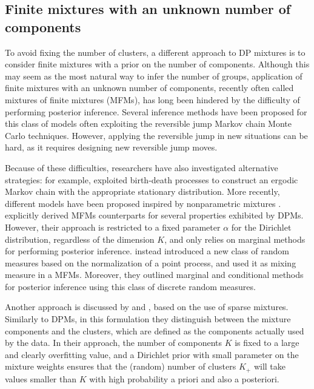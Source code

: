 \subsection{Finite mixtures with an unknown number of components}
To avoid fixing the number of clusters, a different approach to DP mixtures is to consider finite mixtures with a prior on the number of components. Although this may seem as the most natural way to infer the number of groups, application of finite mixtures with an unknown number of components, recently often called mixtures of finite mixtures (MFMs), has long been hindered by the difficulty of performing posterior inference. 
Several inference methods have been proposed for this class of models \parencite{richardson1997,nobile2004,nobile2007, McCullagh2008} often exploiting the reversible jump Markov chain Monte Carlo techniques. However, applying the reversible jump in new situations can be hard, as it requires designing new reversible jump moves. 

Because of these difficulties, researchers have also investigated alternative strategies: for example, \textcite{Stephens2000} exploited birth-death processes to construct an ergodic Markov chain with the appropriate stationary distribution.
More recently, different models have been proposed inspired by nonparametric mixtures \parencite{miller2018, argiento2019}. \textcite{miller2018} explicitly derived MFMs counterparts for several properties exhibited by DPMs. However, their approach is restricted to a fixed parameter $\alpha$ for the Dirichlet distribution, regardless of the dimension $K$, and only relies on marginal methods for performing posterior inference.
\textcite{argiento2019} instead introduced a new class of random measures based on the normalization of a point process, 
and used it as mixing measure in a MFMs. Moreover, they outlined marginal and conditional methods for posterior inference using this class of discrete random measures.

Another approach is discussed by \textcite{malsinerwalli2016} and \textcite{fs2019}, based on the use of sparse mixtures. Similarly to DPMs, in this formulation they distinguish between the mixture components and the clusters, which are defined as the components actually used by the data. In their approach, the number of components $K$ is fixed to a large and clearly overfitting value, and a Dirichlet prior with small parameter on the mixture weights ensures that the (random) number of clusters $K_+$ will take values smaller than $K$ with high probability a priori and also a posteriori.

